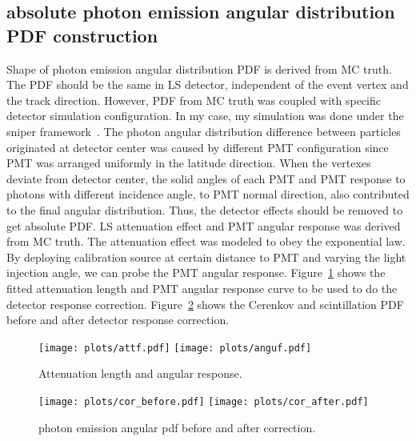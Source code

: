\documentclass[a4paper,10pt]{cpc-hepnp}
\begin{document}
\subsection{absolute photon emission angular distribution PDF construction}
Shape of photon emission angular distribution PDF is derived from MC truth. The
PDF should be the same in LS detector, independent of the event vertex and the
track direction. However, PDF from MC truth was coupled with specific detector
simulation configuration. In my case, my simulation was done under the sniper
framework~\cite{sniper}. The photon angular distribution difference between particles
originated at detector center was caused by different PMT configuration since
PMT was arranged uniformly in the latitude direction.
When the vertexes deviate from detector center, the solid angles of each PMT
and PMT response to photons with different incidence angle, to PMT normal
direction, also contributed to the final angular distribution. Thus, the detector
effects should be removed to get absolute PDF. LS attenuation effect and PMT
angular response was derived from MC truth. The attenuation effect was modeled to
obey the exponential law. By deploying calibration source at certain distance to
PMT and varying the light injection angle, we can probe the PMT angular
response. Figure~\ref{att_angu} shows the fitted attenuation length and PMT
angular response curve to be used to do the detector response correction.
Figure~\ref{xzcomp} shows the Cerenkov and scintillation PDF before and after
detector response correction.
\begin{figure}[htbp]
\centering %
\texttt{[image: plots/attf.pdf]}
\hfill
\texttt{[image: plots/anguf.pdf]}
\caption{\label{att_angu} Attenuation length and angular response.}
\end{figure}
\begin{figure}[htbp]
\centering %
\texttt{[image: plots/cor\_before.pdf]}%
\hfill
\texttt{[image: plots/cor\_after.pdf]}%
\caption{\label{xzcomp} photon emission angular pdf before and after
correction.}
\end{figure}
\end{document}
